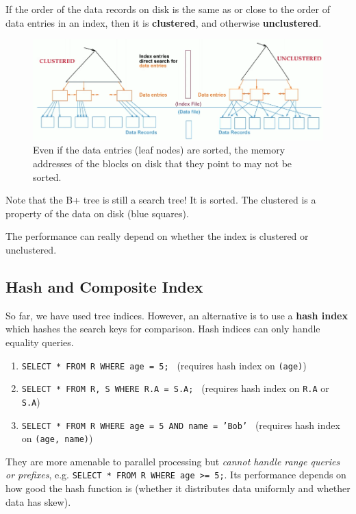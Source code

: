 \documentclass{article}
\begin{document}
      \begin{definition}
        If the order of the data records on disk is the same as or close to the order of data entries in an index, then it is \textbf{clustered}, and otherwise \textbf{unclustered}. 

        \begin{figure}[H]
          \centering 
          \includegraphics[scale=0.4]{img/clustered_vs_unclustered.png}
          \caption{Even if the data entries (leaf nodes) are sorted, the memory addresses of the blocks on disk that they point to may not be sorted.} 
          \label{fig:clustered_vs_unclustered}
        \end{figure}

        Note that the B+ tree is still a search tree! It is sorted. The clustered is a property of the data on disk (blue squares). 
      \end{definition}

      The performance can really depend on whether the index is clustered or unclustered. 

  \subsection{Hash and Composite Index}

    \begin{definition}
      So far, we have used tree indices. However, an alternative is to use a \textbf{hash index} which hashes the search keys for comparison. Hash indices can only handle equality queries. 
      \begin{enumerate}
        \item \texttt{SELECT * FROM R WHERE age = 5; } (requires hash index on \texttt{(age)})
        \item \texttt{SELECT * FROM R, S WHERE R.A = S.A; } (requires hash index on \texttt{R.A} or \texttt{S.A})
        \item \texttt{SELECT * FROM R WHERE age = 5 AND name = 'Bob' } (requires hash index on \texttt{(age, name)})
      \end{enumerate}
      They are more amenable to parallel processing but \textit{cannot handle range queries or prefixes}, e.g. \texttt{SELECT * FROM R WHERE age >= 5;}. Its performance depends on how good the hash function is (whether it distributes data uniformly and whether data has skew). 
    \end{definition}
\end{document}
